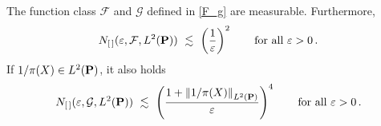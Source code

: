 \begin{lemma}
  \label{aa:mean:l:br}
  The function class $\mathcal{F}$ and $\mathcal{G}$ defined in \eqref{F_g} are measurable.
  Furthermore, 
  \begin{gather*}
    N_{[\,]}
    (
    \varepsilon
    ,
    \mathcal{F}, L^2(\P))
    \ 
    \lesssim
    \ 
    \left( 
      \frac{1}{\varepsilon}
    \right)^2
    \qquad
    \text{for all}
    \ 
    \varepsilon>0
    \,.
  \end{gather*}
  If $1/\pi(X)\in L^2(\P)$, it also holds 
  \begin{gather*}
    N_{[\,]}
    (
    \varepsilon
    ,
    \mathcal{G}, L^2(\P))
    \ 
    \lesssim
    \ 
    \left( 
    \frac{
      1+
    \norm{1/\pi(X)}_{ L^2(\P)}
    }
    {\varepsilon}
    \right)^4
    \qquad
    \text{for all}
    \ 
    \varepsilon>0
    \,.
  \end{gather*}
\end{lemma}

